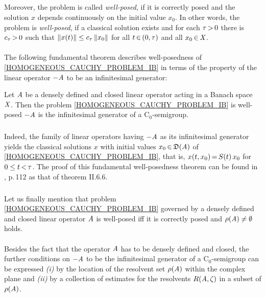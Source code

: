 \documentclass[11pt,twoside]{article}
\begin{document}
\subparagraph{}
Moreover,
the problem is called \textit{well-posed},
if it is correctly posed and
the solution $x$ depends continuously on the initial value $x_0$.
In other words,
the problem is \textit{well-posed},
if a classical solution exists and
for each $\tau {\,>\,} 0$ there is $c_{\tau} {\,>\,} 0$ such that
$\left\lVert x(t) \right\rVert \leq c_{\tau} \left\lVert x_0 \right\rVert$
for all $t {\,\in\,} (0,\tau)$ and all $x_0 {\,\in\,} \mathit{X}$.

\paragraph{} %
The following fundamental theorem describes
well-posedness of \eqref{HOMOGENEOUS_CAUCHY_PROBLEM_IB}
in terms of the property of the linear operator ${-}\mathit{A}$
to be an infinitesimal generator:

\begin{theorem}\label{WELL_POSEDNESS_THEOREM_I}
Let $\mathit{A}$ be a densely defined and closed linear operator
acting in a Banach space $\mathit{X}$.
Then the problem \eqref{HOMOGENEOUS_CAUCHY_PROBLEM_IB} is well-posed
\iff
${-}\mathit{A}$ is the infinitesimal generator of a C$_0$-semigroup.
\end{theorem}

\subparagraph{}
Indeed,
the family {\SG} of linear operators
having ${-}\mathit{A}$ as its infinitesimal generator
yields the classical solutions $x$ with initial values
$x_0 {\,\in\,} \mathfrak{D}(\mathit{A})$ of \eqref{HOMOGENEOUS_CAUCHY_PROBLEM_IB},
that is,
$x(t,x_0) {\,=\,} S(t)\,x_0$ for $0 \leq t {\,<\,} \tau$.
The proof of this fundamental well-posedness theorem can be found in \cite{EN},
p.\,112 as that of theorem II.6.6.

\subparagraph{}
Let us finally mention that problem \eqref{HOMOGENEOUS_CAUCHY_PROBLEM_IB}
governed by a densely defined and closed linear operator $\mathit{A}$ is well-posed
iff
it is correctly posed and $\rho(\mathit{A}) \ne \emptyset$ holds.

\paragraph{} %
Besides the fact that
the operator $\mathit{A}$ has to be densely defined and closed,
the further conditions on ${-}\mathit{A}$ to be the infinitesimal generator
of a C$_0$-semigroup can be expressed 
\textit{(i)}  by the location of the resolvent set $\rho(\mathit{A})$
              within the complex plane and
\textit{(ii)} by a collection of estimates for the resolvents $R(\mathit{A},\zeta)$
              in a subset of $\rho(\mathit{A})$.
\end{document}
